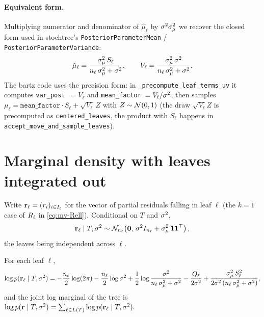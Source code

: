 \paragraph{Equivalent form.}
Multiplying numerator and denominator of $\hat\mu_\ell$ by $\sigma^{2}\sigma_\mu^{2}$ we
recover the closed form used in stochtree's
\texttt{PosteriorParameterMean} / \texttt{PosteriorParameterVariance}:
\begin{equation}
	\label{eq:leaf-fc-tau}
	\hat\mu_\ell = \frac{\sigma_\mu^{2}\, S_\ell}{n_\ell\,\sigma_\mu^{2} + \sigma^{2}},
	\qquad
	V_\ell = \frac{\sigma_\mu^{2}\,\sigma^{2}}{n_\ell\,\sigma_\mu^{2} + \sigma^{2}}.
\end{equation}
The bartz code uses the precision form: in
\texttt{\_precompute\_leaf\_terms\_uv} it computes
\texttt{var\_post}~$= V_\ell$ and \texttt{mean\_factor}~$= V_\ell / \sigma^{2}$,
then samples $\mu_\ell = \texttt{mean\_factor} \cdot S_\ell + \sqrt{V_\ell}\, Z$
with $Z \sim \mathcal{N}(0,1)$ (the draw $\sqrt{V_\ell} Z$ is precomputed as
\texttt{centered\_leaves}, the product with $S_\ell$ happens in
\texttt{accept\_move\_and\_sample\_leaves}).

\section{Marginal density with leaves integrated out}
\label{sec:marg-lik}

Write $\mathbf{r}_\ell = (r_i)_{i \in I_\ell}$ for the vector of partial residuals
falling in leaf $\ell$ (the $k = 1$ case of $R_\ell$ in
\eqref{eq:mv-Rell}). Conditional on $T$ and $\sigma^{2}$,
\[
	\mathbf{r}_\ell \mid T, \sigma^{2} \sim
	\mathcal{N}_{n_\ell}\!\left(\mathbf{0},\, \sigma^{2} I_{n_\ell} + \sigma_\mu^{2}\,\mathbf{1}\mathbf{1}^\top\right),
\]
the leaves being independent across $\ell$.

\begin{prop}
	\label{prop:marglik}
	For each leaf $\ell$,
	\begin{equation}
		\label{eq:marglik-full}
		\log p(\mathbf{r}_\ell \mid T, \sigma^{2})
		= -\frac{n_\ell}{2}\log(2\pi)
		- \frac{n_\ell}{2}\log\sigma^{2}
		+ \frac{1}{2}\log\frac{\sigma^{2}}{n_\ell\,\sigma_\mu^{2} + \sigma^{2}}
		- \frac{Q_\ell}{2\sigma^{2}}
		+ \frac{\sigma_\mu^{2}\, S_\ell^{2}}{2\sigma^{2}\,(n_\ell\,\sigma_\mu^{2} + \sigma^{2})},
	\end{equation}
	and the joint log marginal of the tree is
	\(
	\log p(\mathbf{r} \mid T, \sigma^{2}) = \sum_{\ell \in L(T)} \log p(\mathbf{r}_\ell \mid T, \sigma^{2}).
	\)
\end{prop}

